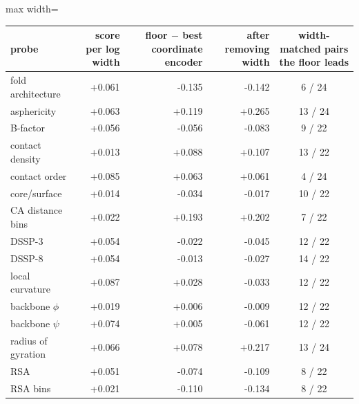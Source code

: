\begin{adjustbox}{max width=\linewidth}
\begin{tabular}{lrrrc}
\toprule
\rowcolor{CompassLavender!32}
probe & score per log width & floor $-$ best coordinate encoder & after removing width & width-matched pairs the floor leads \\
\midrule
fold architecture & +0.061 & -0.135 & -0.142 & 6 / 24 \\
asphericity & +0.063 & +0.119 & +0.265 & 13 / 24 \\
B-factor & +0.056 & -0.056 & -0.083 & 9 / 22 \\
contact density & +0.013 & +0.088 & +0.107 & 13 / 22 \\
contact order & +0.085 & +0.063 & +0.061 & 4 / 24 \\
core/surface & +0.014 & -0.034 & -0.017 & 10 / 22 \\
CA distance bins & +0.022 & +0.193 & +0.202 & 7 / 22 \\
DSSP-3 & +0.054 & -0.022 & -0.045 & 12 / 22 \\
DSSP-8 & +0.054 & -0.013 & -0.027 & 14 / 22 \\
local curvature & +0.087 & +0.028 & -0.033 & 12 / 22 \\
backbone $\phi$ & +0.019 & +0.006 & -0.009 & 12 / 22 \\
backbone $\psi$ & +0.074 & +0.005 & -0.061 & 12 / 22 \\
radius of gyration & +0.066 & +0.078 & +0.217 & 13 / 24 \\
RSA & +0.051 & -0.074 & -0.109 & 8 / 22 \\
RSA bins & +0.021 & -0.110 & -0.134 & 8 / 22 \\
\bottomrule
\end{tabular}
\end{adjustbox}
